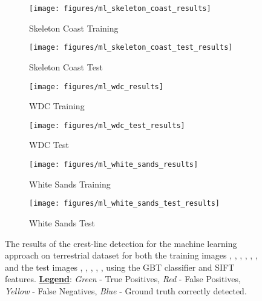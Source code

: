 \begin{figure}
	\ContinuedFloat
	\centering
	\begin{subfigure}{0.48\textwidth}
		\centering
		\texttt{[image: figures/ml\_skeleton\_coast\_results]}
		\caption{ Skeleton Coast Training }
		\label{fig:ml_skeleton_coast_results}
	\end{subfigure}
	\begin{subfigure}{0.48\textwidth}
		\centering
		\texttt{[image: figures/ml\_skeleton\_coast\_test\_results]}
		\caption{ Skeleton Coast Test }
		\label{fig:ml_skeleton_coast_test_results}
	\end{subfigure}
	\begin{subfigure}{0.48\textwidth}
		\centering
		\texttt{[image: figures/ml\_wdc\_results]}
		\caption{ WDC Training }
		\label{fig:ml_wdc_results}
	\end{subfigure}
	\begin{subfigure}{0.48\textwidth}
		\centering
		\texttt{[image: figures/ml\_wdc\_test\_results]}
		\caption{ WDC Test }
		\label{fig:ml_wdc_test_results}
	\end{subfigure}
	\begin{subfigure}{0.48\textwidth}
		\centering
		\texttt{[image: figures/ml\_white\_sands\_results]}
		\caption{ White Sands Training }
		\label{fig:ml_white_sands_results}
	\end{subfigure}
	\begin{subfigure}{0.48\textwidth}
		\centering
		\texttt{[image: figures/ml\_white\_sands\_test\_results]}
		\caption{ White Sands Test }
		\label{fig:ml_white_sands_test_results}
	\end{subfigure}
	\caption{ The results of the  crest-line detection for the machine learning approach on terrestrial dataset for both the training images , , , , , , and the test images , , , , ,  using the GBT classifier and SIFT features. \underline{\textbf{Legend}}: \emph{Green} - True Positives, \emph{Red} - False Positives, \emph{Yellow} - False Negatives, \emph{Blue} - Ground truth correctly detected.  }
	\label{fig:ml_results}
\end{figure}

